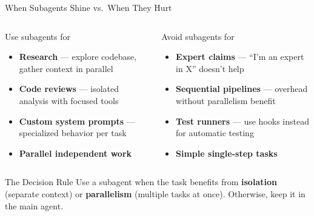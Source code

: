 \documentclass[aspectratio=169]{beamer}
\begin{document}
\begin{frame}{When Subagents Shine vs.\ When They Hurt}
\begin{columns}[T]
\begin{exampleblock}{Use subagents for}
\begin{itemize}
  \item \textbf{Research} --- explore codebase, gather context in parallel
  \item \textbf{Code reviews} --- isolated analysis with focused tools
  \item \textbf{Custom system prompts} --- specialized behavior per task
  \item \textbf{Parallel independent work}
\end{itemize}
\end{exampleblock}

\begin{alertblock}{Avoid subagents for}
\begin{itemize}
  \item \textbf{Expert claims} --- ``I'm an expert in X'' doesn't help
  \item \textbf{Sequential pipelines} --- overhead without parallelism benefit
  \item \textbf{Test runners} --- use hooks instead for automatic testing
  \item \textbf{Simple single-step tasks}
\end{itemize}
\end{alertblock}
\end{columns}

\bigskip
\begin{block}{The Decision Rule}
\centering
Use a subagent when the task benefits from \textbf{isolation} (separate context) or \textbf{parallelism} (multiple tasks at once). Otherwise, keep it in the main agent.
\end{block}
\end{frame}
\end{document}
